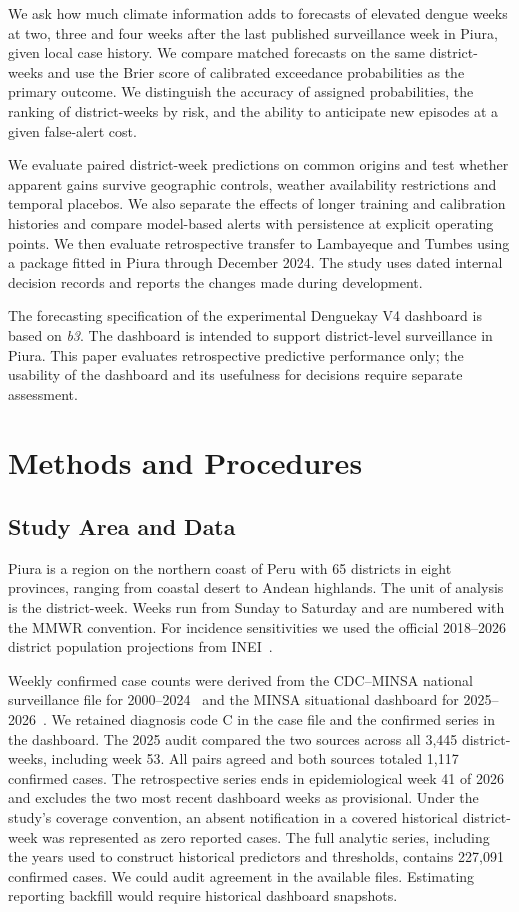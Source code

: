\documentclass[journal]{IEEEtran}
\newcommand{\bthree}{\textit{b3}}
\begin{document}
We ask how much climate information adds to forecasts of elevated dengue weeks at two, three and four weeks after the last published surveillance week in Piura, given local case history. We compare matched forecasts on the same district-weeks and use the Brier score of calibrated exceedance probabilities as the primary outcome. We distinguish the accuracy of assigned probabilities, the ranking of district-weeks by risk, and the ability to anticipate new episodes at a given false-alert cost.

We evaluate paired district-week predictions on common origins and test whether apparent gains survive geographic controls, weather availability restrictions and temporal placebos. We also separate the effects of longer training and calibration histories and compare model-based alerts with persistence at explicit operating points. We then evaluate retrospective transfer to Lambayeque and Tumbes using a package fitted in Piura through December 2024. The study uses dated internal decision records and reports the changes made during development.

The forecasting specification of the experimental Denguekay V4 dashboard is based on \bthree{}. The dashboard is intended to support district-level surveillance in Piura. This paper evaluates retrospective predictive performance only; the usability of the dashboard and its usefulness for decisions require separate assessment.

\section{Methods and Procedures}

\subsection{Study Area and Data}
Piura is a region on the northern coast of Peru with 65 districts in eight provinces, ranging from coastal desert to Andean highlands. The unit of analysis is the district-week. Weeks run from Sunday to Saturday and are numbered with the MMWR convention. For incidence sensitivities we used the official 2018--2026 district population projections from INEI~\cite{inei2025}.

Weekly confirmed case counts were derived from the CDC--MINSA national surveillance file for 2000--2024~\cite{cdcminsa} and the MINSA situational dashboard for 2025--2026~\cite{minsasala}. We retained diagnosis code C in the case file and the confirmed series in the dashboard. The 2025 audit compared the two sources across all 3,445 district-weeks, including week 53. All pairs agreed and both sources totaled 1,117 confirmed cases. The retrospective series ends in epidemiological week 41 of 2026 and excludes the two most recent dashboard weeks as provisional. Under the study's coverage convention, an absent notification in a covered historical district-week was represented as zero reported cases. The full analytic series, including the years used to construct historical predictors and thresholds, contains 227,091 confirmed cases. We could audit agreement in the available files. Estimating reporting backfill would require historical dashboard snapshots.
\end{document}
